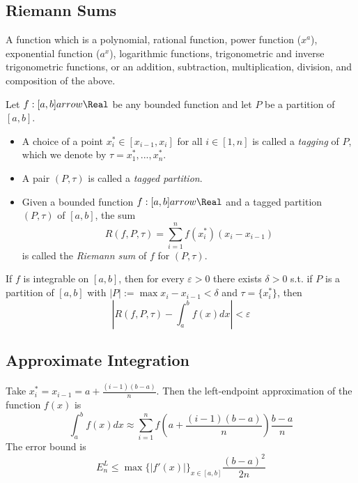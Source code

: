 \subsection*{Riemann Sums}

\begin{definition}
  A function which is a polynomial, rational function, power function ($x^a$), exponential function ($a^x$), logarithmic functions, trigonometric and inverse trigonometric functions, or an addition, subtraction, multiplication, division, and composition of the above.
\end{definition} 

\begin{definition}
  Let $f : [a, b] arrow \Real$ be any bounded function and let $P$ be a partition of $[a, b]$.
  \begin{itemize}
    \item A choice of a point ${x_i^*} \in [x_{i-1}, x_{i}]$ for all $i \in [1, n]$ is called a \textit{tagging} of $P$, which we denote by $\tau = {x_1^*, ..., x_n^*}$.
    \item A pair $(P, \tau)$ is called a \textit{tagged partition}.
    \item Given a bounded function $f : [a, b] arrow \Real$ and a tagged partition $(P, \tau)$ of $[a, b]$, the sum 
    \[
      R(f, P, \tau) = \sum_{i=1}^{n} f(x_i^*)(x_i - x_{i-1})
    \]
    is called the \textit{Riemann sum} of $f$ for $(P, \tau)$.
  \end{itemize}
\end{definition}

\begin{theorem}
  If $f$ is integrable on $[a, b]$, then for every $\varepsilon > 0$ there exists $\delta > 0$ s.t. if $P$ is a partition of $[a, b]$ with $|P| := \max{x_i - x_{i-1}} < \delta$ and $\tau = \{x_i^*\}$, then 
  \[
    | R(f, P, \tau) - \int_a^b f(x) dx | < \varepsilon
  \] 
\end{theorem}

\subsection*{Approximate Integration}

\begin{definition}
  Take $x_i^* = x_{i-1} = a + \frac{(i-1)(b-a)}{n}$. Then the left-endpoint approximation of the function $f(x)$ is
  \[
    \int_a^b f(x) dx \approx \sum_{i=1}^n f\left(a + \frac{(i-1)(b-a)}{n}\right) \frac{b-a}{n}
  \]
  The error bound is
  \[
    E_n^L \leq \max\{|f'(x)|\}_{x \in [a, b]} \frac{(b-a)^2}{2n}
  \]
\end{definition}

